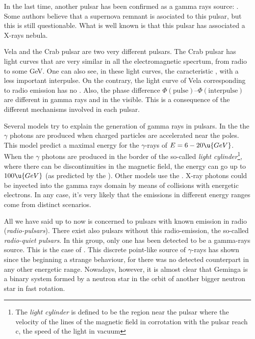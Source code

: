 In the last time, another pulsar has been confirmed as a gamma rays
source: . Some authors believe that a supernova
remnant is asociated to this pulsar, but this is still
questionable. What is well known is that this pulsar has associated a
X-rays nebula.

Vela and the Crab pulsar are two very different pulsars. The Crab
pulsar has light curves that are very similar in all the
electromagnetic specrtum, from radio to some GeV. One can also see, in
these light curves, the caracteristic , with a less
important interpulse. On the contrary, the light curve of Vela
corresponding to radio emission has no . Also, the phase
difference $\Phi(\mathrm{pulse})$--$\Phi(\mathrm{interpulse})$ are
different in gamma rays and in the visible. This is a consequence of
the different mechanisms involved in each pulsar.

\pulsarschfig

Several models try to explain the generation of gamma rays in pulsars.
In the \emph{} the $\gamma$ photons are produced
when charged particles are accelerated near the poles. This model
predict a maximal energy for the $\gamma$-rays of
$E=6-20\u{GeV}$. When the $\gamma$ photons are produced in the border
of the so-called \emph{light cylinder}\footnote{The \emph{light
cylinder} is defined to be the region near the pulsar where the
velocity of the lines of the magnetic field in corrotation with the
pulsar reach c, the speed of the light in vacuum}, where there can be
discontinuities in the magnetic field, the energy can go up to
$100\u{GeV}$ (as predicted by the \emph{}). Other
models use the \emph{}. X-ray photons could
be inyected into the gamma rays domain by means of collisions with
energetic electrons. In any case, it's very likely that the emissions
in different energy ranges come from distinct scenarios.

All we have said up to now is concerned to pulsars with known emission
in radio (\emph{radio-pulsars}). There exist also pulsars without this
radio-emission, the so-called \emph{radio-quiet pulsars}. In this
group, only one has been detected to be a gamma-rays source. This is
the case of . This discrete point-like source of
$\gamma$-rays has shown since the beginning a strange behaviour, for
there was no detected counterpart in any other energetic range.
Nowadays, however, it is almost clear that Geminga is a binary system
formed by a neutron star in the orbit of another bigger neutron star
in fast rotation.

